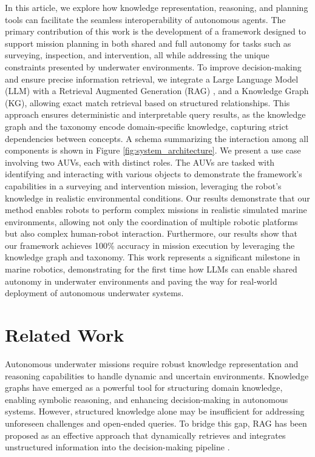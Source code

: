 \documentclass[journal]{IEEEtran}
\begin{document}
In this article, we explore how knowledge representation, reasoning, and planning tools can facilitate the seamless interoperability of autonomous agents. The primary contribution of this work is the development of a framework designed to support mission planning in both shared and full autonomy for tasks such as surveying, inspection, and intervention, all while addressing the unique constraints presented by underwater environments. To improve decision-making and ensure precise information retrieval, we integrate a Large Language Model (LLM) with a Retrieval Augmented Generation (RAG) \cite{rag}, and a Knowledge Graph (KG), allowing exact match retrieval based on structured relationships. This approach ensures deterministic and interpretable query results, as the knowledge graph and the taxonomy encode domain-specific knowledge, capturing strict dependencies between concepts. A schema summarizing the interaction among all components is shown in Figure \ref{fig:system_architecture}.
We present a use case involving two AUVs, each with distinct roles. The AUVs are tasked with identifying and interacting with various objects to demonstrate the framework’s capabilities in a surveying and intervention mission, leveraging the robot’s knowledge in realistic environmental conditions.
Our results demonstrate that our method enables robots to perform complex missions in realistic simulated marine environments, allowing not only the coordination of multiple robotic platforms but also complex human-robot interaction.   
Furthermore, our results show that our framework achieves 100\% accuracy in mission execution by leveraging the knowledge graph and taxonomy. This work represents a significant milestone in marine robotics, demonstrating for the first time how LLMs can enable shared autonomy in underwater environments and paving the way for real-world deployment of autonomous underwater systems.







\section{Related Work}

Autonomous underwater missions require robust knowledge representation and reasoning capabilities to handle dynamic and uncertain environments.  Knowledge graphs have emerged as a powerful tool for structuring domain knowledge, enabling symbolic reasoning, and enhancing decision-making in autonomous systems. However, structured knowledge alone may be insufficient for addressing unforeseen challenges and open-ended queries. To bridge this gap, RAG has been proposed as an effective approach that dynamically retrieves and integrates unstructured information into the decision-making pipeline \cite{rag}.
\end{document}
